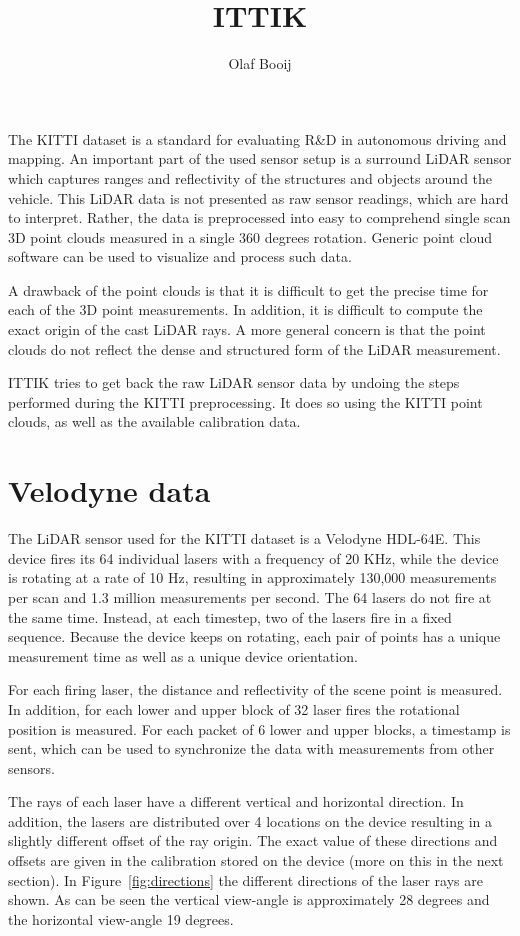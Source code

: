 \documentclass[english]{article}
\begin{document}
\title{ITTIK}
\author{Olaf Booij}

\maketitle

The KITTI dataset is a standard for evaluating R\&D in autonomous
driving and mapping. An important part of the used sensor setup is a
surround LiDAR sensor which captures ranges and reflectivity of the
structures and objects around the vehicle.
This LiDAR data is not presented as raw sensor readings, which are hard
to interpret. Rather, the data is preprocessed into easy to comprehend
single scan 3D point clouds measured in a single 360 degrees rotation.
Generic point cloud software can be used to visualize and process such
data.

A drawback of the point clouds is that it is difficult to get the
precise time for each of the 3D point measurements. In addition, it is
difficult to compute the exact origin of the cast LiDAR rays. A more
general concern is that the point clouds do not reflect the dense and
structured form of the LiDAR measurement.

ITTIK tries to get back the raw LiDAR sensor data by undoing the steps
performed during the KITTI preprocessing. It does so using the KITTI
point clouds, as well as the available calibration data.

\section{Velodyne data}
The LiDAR sensor used for the KITTI dataset is a Velodyne HDL-64E. This
device fires its 64 individual lasers with a frequency of 20 KHz, while
the device is rotating at a rate of 10 Hz, resulting in approximately
130,000 measurements per scan and 1.3 million measurements per
second. The 64 lasers do not fire at the same time. Instead, at each
timestep, two of the lasers fire in a fixed sequence. Because the device
keeps on rotating, each pair of points has a unique measurement time as
well as a unique device orientation.

For each firing laser, the distance and reflectivity of the scene point
is measured. In addition, for each lower and upper block of 32 laser
fires the rotational position is measured. For each packet of 6 lower
and upper blocks, a timestamp is sent, which can be used to
synchronize the data with measurements from other sensors.

The rays of each laser have a different vertical and horizontal
direction. In addition, the lasers are distributed over 4 locations on
the device resulting in a slightly different offset of the ray origin.
The exact value of these directions and offsets are given in the
calibration stored on the device (more on this in the next section).
In Figure~\ref{fig:directions} the different directions of the laser
rays are shown. As can be seen the vertical view-angle is approximately
28 degrees and the horizontal view-angle 19 degrees.
\end{document}
